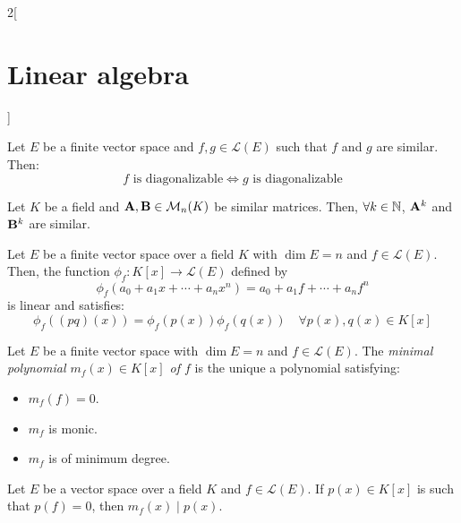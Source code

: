 \documentclass[../../../main.tex]{subfiles}
\begin{document}
\begin{multicols}{2}[\section{Linear algebra}]
\begin{corollary}
\end{corollary}
\begin{prop}
    Let $E$ be a finite vector space and $f,g\in\mathcal{L}(E)$ such that $f$ and $g$ are similar. Then: $$f\text{ is diagonalizable}\iff g\text{ is diagonalizable}$$
\end{prop}
\begin{lemma}
    Let $K$ be a field and $\vb{A},\vb{B}\in\mathcal{M}_n(K)$ be similar matrices. Then, $\forall k\in\mathbb{N}$, $\vb{A}^k$ and $\vb{B}^k$ are similar.
\end{lemma}
\begin{lemma}
    Let $E$ be a finite vector space over a field $K$ with $\dim E=n$ and $f\in\mathcal{L}(E)$. Then, the function $\phi_f:K[x]\rightarrow\mathcal{L}(E)$ defined by $$\phi_f(a_0+a_1x+\cdots+a_nx^n)=a_0+a_1f+\cdots+a_nf^n$$
    is linear and satisfies: $$\phi_f((pq)(x))=\phi_f(p(x))\phi_f(q(x))\quad\forall p(x),q(x)\in K[x]$$
\end{lemma}
\begin{definition}
    Let $E$ be a finite vector space with $\dim E=n$ and $f\in\mathcal{L}(E)$. The \textit{minimal polynomial $m_f(x)\in K[x]$ of $f$} is the unique a polynomial satisfying:
    \begin{itemize}
        \item $m_f(f)=0$.
        \item $m_f$ is monic.
        \item $m_f$ is of minimum degree.
    \end{itemize}
\end{definition}
\begin{prop}
    Let $E$ be a vector space over a field $K$ and $f\in\mathcal{L}(E)$. If $p(x)\in K[x]$ is such that $p(f)=0$, then $m_f(x)\mid p(x)$.
\end{prop}

\end{multicols}
\end{document}
